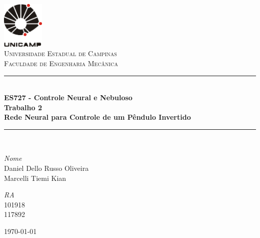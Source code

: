 \begin{titlepage}
\begin{center}

\newcommand{\HRule}{\rule{\linewidth}{0.5mm}}
\includegraphics[width=0.15\textwidth]{logoUnicamp}~\\[1cm]

\textsc{\LARGE Universidade Estadual de Campinas}\\[1.5cm]

\textsc{\Large Faculdade de Engenharia Mecânica}\\[0.5cm]

\HRule \\[0.4cm]
{ \huge \bfseries ES727 - Controle Neural e Nebuloso\\ \vspace{1cm} Trabalho 2\\
\Large{Rede Neural para Controle de um Pêndulo Invertido} \\[0.4cm] }

\HRule \\[1cm]

\begin{minipage}{0.6\textwidth}
\begin{flushleft} \large
\emph{Nome}\\
Daniel Dello Russo Oliveira\\
Marcelli Tiemi Kian
\end{flushleft}
\end{minipage}
\begin{minipage}{0.2\textwidth}
\begin{flushright} \large
\emph{RA}\\ 101918\\
117892
\end{flushright}
\end{minipage}
\begin{minipage}{0.2\textwidth}
	\begin{flushright} \large
	\end{flushright}
\end{minipage}

\vfill

{\large \today}

\end{center}
\end{titlepage}

